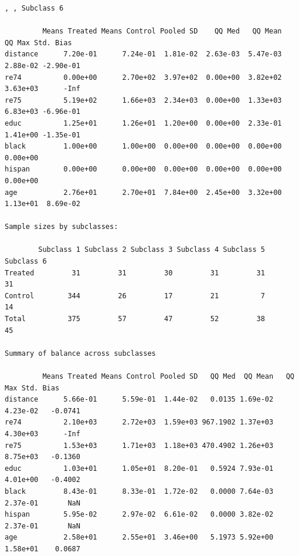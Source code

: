 \documentclass[oneside,letterpaper,titlepage]{article}
\begin{document}
\begin{enumerate}

\begin{verbatim}
, , Subclass 6

         Means Treated Means Control Pooled SD    QQ Med   QQ Mean    QQ Max Std. Bias
distance      7.20e-01      7.24e-01  1.81e-02  2.63e-03  5.47e-03  2.88e-02 -2.90e-01
re74          0.00e+00      2.70e+02  3.97e+02  0.00e+00  3.82e+02  3.63e+03      -Inf
re75          5.19e+02      1.66e+03  2.34e+03  0.00e+00  1.33e+03  6.83e+03 -6.96e-01
educ          1.25e+01      1.26e+01  1.20e+00  0.00e+00  2.33e-01  1.41e+00 -1.35e-01
black         1.00e+00      1.00e+00  0.00e+00  0.00e+00  0.00e+00  0.00e+00          
hispan        0.00e+00      0.00e+00  0.00e+00  0.00e+00  0.00e+00  0.00e+00          
age           2.76e+01      2.70e+01  7.84e+00  2.45e+00  3.32e+00  1.13e+01  8.69e-02
        
Sample sizes by subclasses:

        Subclass 1 Subclass 2 Subclass 3 Subclass 4 Subclass 5 Subclass 6
Treated         31         31         30         31         31         31
Control        344         26         17         21          7         14
Total          375         57         47         52         38         45

Summary of balance across subclasses

         Means Treated Means Control Pooled SD   QQ Med  QQ Mean   QQ Max Std. Bias
distance      5.66e-01      5.59e-01  1.44e-02   0.0135 1.69e-02 4.23e-02   -0.0741
re74          2.10e+03      2.72e+03  1.59e+03 967.1902 1.37e+03 4.30e+03      -Inf
re75          1.53e+03      1.71e+03  1.18e+03 470.4902 1.26e+03 8.75e+03   -0.1360
educ          1.03e+01      1.05e+01  8.20e-01   0.5924 7.93e-01 4.01e+00   -0.4002
black         8.43e-01      8.33e-01  1.72e-02   0.0000 7.64e-03 2.37e-01       NaN
hispan        5.95e-02      2.97e-02  6.61e-02   0.0000 3.82e-02 2.37e-01       NaN
age           2.58e+01      2.55e+01  3.46e+00   5.1973 5.92e+00 1.58e+01    0.0687
        

\end{verbatim}
\end{enumerate}
\end{document}

